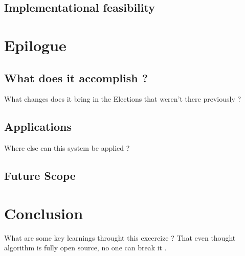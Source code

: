 \documentclass[12pt]{report}
\begin{document}
\section{Implementational feasibility}


\chapter{Epilogue}
\section{What does it accomplish ?}
What changes does it bring in the Elections that weren't there previously ?
\section{Applications}
Where else can this system be applied ?
\section{Future Scope}


\chapter{Conclusion}
What are some key learnings throught this excercize ? That even thought algorithm is fully open source, no one can break it .

\end{document}
